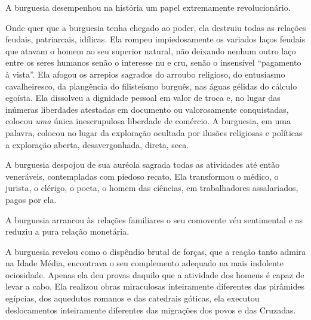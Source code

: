 A burguesia desempenhou na história um papel extremamente
revolucionário.

Onde quer que a burguesia tenha chegado ao poder, ela destruiu todas as          \label{3}
relações feudais, patriarcais, idílicas. Ela rompeu impiedosamente os
variados laços feudais que atavam o homem ao seu superior natural, não
deixando nenhum outro laço entre os seres humanos senão o interesse nu
e cru, senão o insensível ``pagamento à vista''. Ela afogou os arrepios
sagrados do arroubo religioso, do entusiasmo cavalheiresco, da
plangência do filisteísmo burguês, nas águas gélidas do cálculo
egoísta. Ela dissolveu a dignidade pessoal em valor de troca e, no lugar
das inúmeras liberdades atestadas em documento ou valorosamente
conquistadas, colocou \textit{uma} única inescrupulosa liberdade de
comércio. A burguesia, em uma palavra, colocou no lugar da exploração
ocultada por ilusões religiosas e políticas a exploração aberta,
desavergonhada, direta, seca.

A burguesia despojou de sua auréola sagrada todas as atividades até
então veneráveis, contempladas com piedoso recato. Ela transformou o
médico, o jurista, o clérigo, o poeta, o homem das ciências, em
trabalhadores assalariados, pagos por ela.

A burguesia arrancou às relações familiares o seu comovente véu
sentimental e as reduziu a pura relação monetária.                         

A burguesia revelou como o dispêndio brutal de forças, que a reação
tanto admira na Idade Média, encontrava o seu complemento adequado na
mais indolente ociosidade. Apenas ela deu provas daquilo que a
atividade dos homens é capaz de levar a cabo. Ela realizou obras
miraculosas inteiramente diferentes das pirâmides egípcias, dos
aquedutos romanos e das catedrais góticas, ela executou deslocamentos
inteiramente diferentes das migrações dos povos e das Cruzadas.


